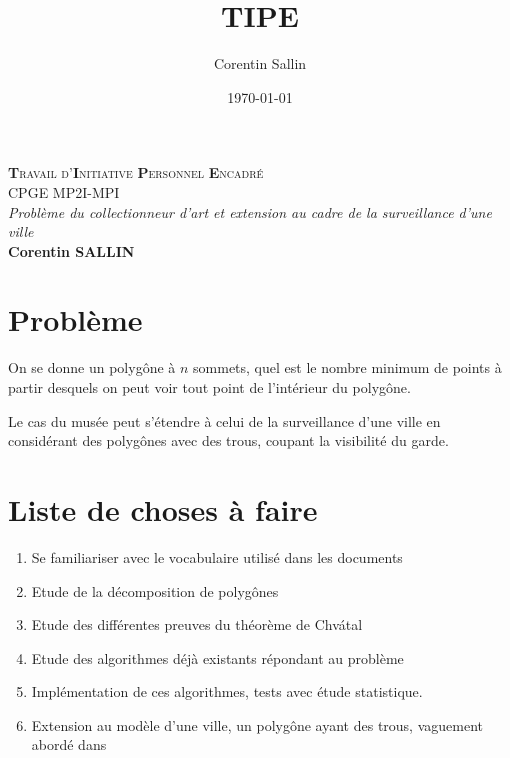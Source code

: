 \documentclass[12pt]{article}
\date{\today}
\author{Corentin Sallin}
\title{TIPE}
\newcommand{\<}{\langle}
\renewcommand{\>}{\rangle}
\theoremstyle{definition}
\begin{document}
\begin{titlepage} %
    \begin{center}
        
            \textsc{ \LARGE{\textbf{T}ravail d'\textbf{I}nitiative \textbf{P}ersonnel \textbf{E}ncadré\\}}
        \textnormal{\LARGE{CPGE MP2I-MPI\\}}
        \vspace{6.5cm}
        \textsl{\Huge{Problème du collectionneur d'art et extension au cadre
        de la surveillance d'une ville}}\\
        \vspace{6cm}
        \textnormal{\Large{\bf Corentin SALLIN\\}}
    \end{center}
\end{titlepage}

\section*{Problème}

On se donne un polygône à  \(n\) sommets, quel est le nombre minimum de points 
à partir desquels on peut voir tout point de l'intérieur du polygône.

Le cas du musée peut s'étendre à celui de la surveillance d'une ville en considérant 
des polygônes avec des trous, coupant la visibilité du garde.


\section*{Liste de choses à faire}

\begin{enumerate}[\(\hookrightarrow\)]
    \item Se familiariser avec le vocabulaire utilisé dans les documents
    \item Etude de la décomposition de polygônes \cite{Lubiw,star,Chatal}
    \item Etude des différentes preuves du théorème de Chvátal \cite{Fisk}
    \item Etude des algorithmes déjà existants répondant au problème \cite{Aggarwal,star,Couto}
    \item Implémentation de ces algorithmes, tests avec étude statistique.
    \item Extension au modèle d'une ville, un polygône ayant des trous,
    vaguement abordé dans \cite{Aggarwal,Aldo}
\end{enumerate}
\end{document}
